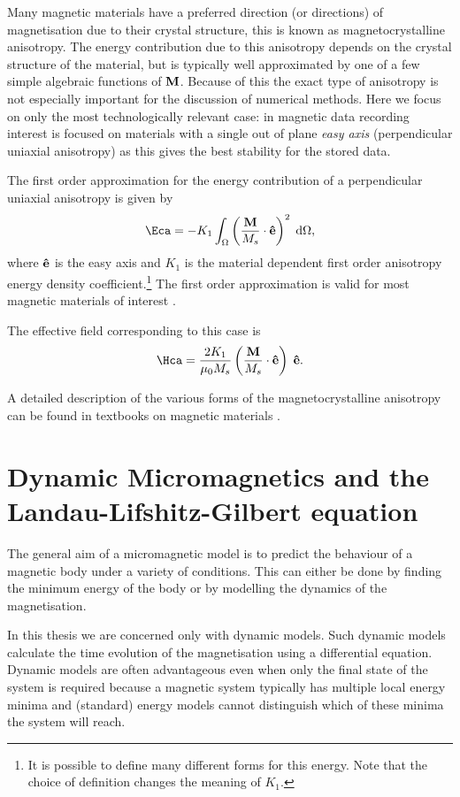 Many magnetic materials have a preferred direction (or directions) of magnetisation due to their crystal structure, this is known as magnetocrystalline anisotropy.
The energy contribution due to this anisotropy depends on the crystal structure of the material, but is typically well approximated by one of a few simple algebraic functions of $\boldsymbol{\mathrm{M}}$.
Because of this the exact type of anisotropy is not especially important for the discussion of numerical methods.
Here we focus on only the most technologically relevant case: in magnetic data recording interest is focused on materials with a single out of plane \emph{easy axis} (perpendicular uniaxial anisotropy) as this gives the best stability for the stored data.

The first order approximation for the energy contribution of a perpendicular uniaxial anisotropy is given by
\begin{equation}
  \Eca = -K_1 \int_\magd \left( \frac{\Mv}{M_s} \cdot \ev \right)^2 \d \magd,
  \label{eq:36}
\end{equation}
where $\boldsymbol{\mathrm{\hat{e}}}$ is the easy axis and $K_1$ is the material dependent first order anisotropy energy density coefficient.\footnote{It is possible to define many different forms for this energy. Note that the choice of definition changes the meaning of $K_1$.}
The first order approximation is valid for most magnetic materials of interest \cite{Coey2010}.

The effective field corresponding to this case is
\begin{equation}
  \Hca = \frac{2 K_1}{\mu_0 M_s} \left( \frac{\Mv}{M_s} \cdot \ev \right) \; \ev.
  \label{eq:Hca}
\end{equation}

A detailed description of the various forms of the magnetocrystalline anisotropy can be found in textbooks on magnetic materials \cite{Coey2010,Aharoni1996}.


\section{Dynamic Micromagnetics and the Landau-Lifshitz-Gilbert equation}
\label{sec:land-lifsch-gilb}

The general aim of a micromagnetic model is to predict the behaviour of a magnetic body under a variety of conditions.
This can either be done by finding the minimum energy of the body or by modelling the dynamics of the magnetisation.

In this thesis we are concerned only with dynamic models.
Such dynamic models calculate the time evolution of the magnetisation using a differential equation.
Dynamic models are often advantageous even when only the final state of the system is required because a magnetic system typically has multiple local energy minima and (standard) energy models cannot distinguish which of these minima the system will reach.

